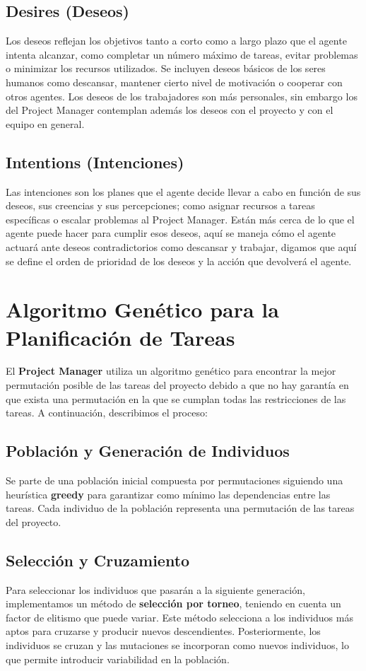 \documentclass[a4paper, 12pt]{article}
\begin{document}
\subsection{Desires (Deseos)}
Los deseos reflejan los objetivos tanto a corto como a largo plazo que el agente intenta alcanzar, como completar un número máximo de tareas, evitar problemas o minimizar los recursos utilizados. Se incluyen deseos básicos de los seres humanos como descansar, mantener cierto nivel de motivación o cooperar con otros agentes. Los deseos de los trabajadores son más personales, sin embargo los del Project Manager contemplan además los deseos con el proyecto y con el equipo en general.

\subsection{Intentions (Intenciones)}
Las intenciones son los planes que el agente decide llevar a cabo en función de sus deseos, sus creencias y sus percepciones; como asignar recursos a tareas específicas o escalar problemas al Project Manager. Están más cerca de lo que el agente puede hacer para cumplir esos deseos, aquí se maneja cómo el agente actuará ante deseos contradictorios como descansar y trabajar, digamos que aquí se define el orden de prioridad de los deseos y la acción que devolverá el agente.

\section{Algoritmo Genético para la Planificación de Tareas}
El \textbf{Project Manager} utiliza un algoritmo genético para encontrar la mejor permutación posible de las tareas del proyecto debido a que no hay garant\'ia en que exista una permutación en la que se cumplan todas las restricciones de las tareas. A continuación, describimos el proceso:

\subsection{Población y Generación de Individuos}
Se parte de una población inicial compuesta por permutaciones siguiendo una heurística \textbf{greedy} para garantizar como m\'inimo las dependencias entre las tareas. Cada individuo de la población representa una permutación de las tareas del proyecto.

\subsection{Selección y Cruzamiento}
Para seleccionar los individuos que pasarán a la siguiente generación, implementamos un método de \textbf{selección por torneo}, teniendo en cuenta un factor de elitismo que puede variar. Este método selecciona a los individuos más aptos para cruzarse y producir nuevos descendientes. Posteriormente, los individuos se cruzan y las mutaciones se incorporan como nuevos individuos, lo que permite introducir variabilidad en la población.
\end{document}

